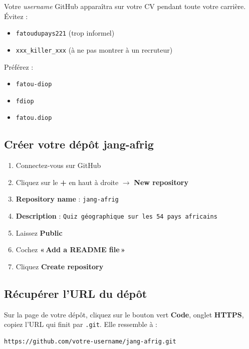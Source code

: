\documentclass[11pt,a4paper]{article}
\newcommand{\cmark}{\ding{51}}
\newcommand{\xmark}{\ding{55}}
\begin{document}
\begin{attentionbox}
Votre \emph{username} GitHub apparaîtra sur votre CV pendant toute votre
carrière. Évitez :
\begin{itemize}[nosep]
    \item \texttt{fatoudupays221} \xmark{} (trop informel)
    \item \texttt{xxx\_killer\_xxx} \xmark{} (à ne pas montrer à un recruteur)
\end{itemize}
Préférez :
\begin{itemize}[nosep]
    \item \texttt{fatou-diop} \cmark
    \item \texttt{fdiop} \cmark
    \item \texttt{fatou.diop} \cmark
\end{itemize}
\end{attentionbox}

\subsection{Créer votre dépôt jang-afrig}

\begin{enumerate}[nosep]
    \item Connectez-vous sur GitHub
    \item Cliquez sur le \textbf{+} en haut à droite $\to$ \textbf{New repository}
    \item \textbf{Repository name} : \texttt{jang-afrig}
    \item \textbf{Description} : \texttt{Quiz géographique sur les 54 pays africains}
    \item Laissez \textbf{Public}
    \item Cochez \textbf{«\,Add a README file\,»}
    \item Cliquez \textbf{Create repository}
\end{enumerate}

\subsection{Récupérer l'URL du dépôt}

Sur la page de votre dépôt, cliquez sur le bouton vert \textbf{Code}, onglet
\textbf{HTTPS}, copiez l'URL qui finit par \texttt{.git}. Elle ressemble à :

\begin{lstlisting}
https://github.com/votre-username/jang-afrig.git
\end{lstlisting}
\end{document}

